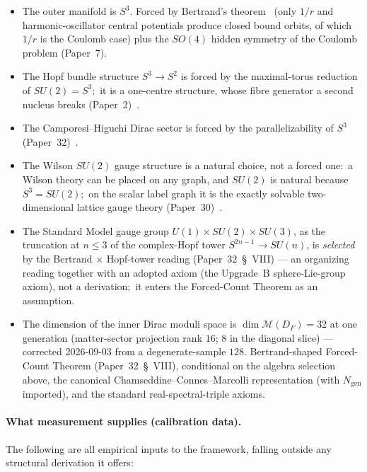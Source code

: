 \documentclass[11pt,a4paper]{article}
\newcommand{\sthree}{S^{3}}
\newcommand{\gvc}[2]{#2}
\begin{document}
\begin{itemize}
  \item The outer manifold is $\sthree$.  Forced by Bertrand's
    theorem~\cite{bertrand1873} (only $1/r$ and harmonic-oscillator
    central potentials produce closed bound orbits, of which $1/r$ is
    the Coulomb case) plus the $SO(4)$ hidden symmetry of the Coulomb
    problem (Paper~7).
  \item The Hopf bundle structure $\sthree \to S^2$ is forced by the
    maximal-torus reduction of $SU(2) = \sthree$;\ it is a one-centre
    structure, whose fibre generator a second nucleus breaks
    (Paper~2)~\cite{loutey_paper2}.
  \item The Camporesi--Higuchi Dirac sector is forced by the
    parallelizability of $\sthree$ (Paper~32)~\cite{loutey_paper32}.
  \item The Wilson $SU(2)$ gauge structure is a natural choice, not a
    forced one:\ a Wilson theory can be placed on any graph, and $SU(2)$
    is natural because $\sthree = SU(2)$;\ on the scalar label graph it is
    the exactly solvable two-dimensional lattice gauge theory
    (Paper~30)~\cite{loutey_paper30}.
  \item \gvc{sm-gauge-group-upgrade-b}{The Standard Model gauge group $U(1) \times SU(2) \times
    SU(3)$, as the truncation at $n \le 3$ of the complex-Hopf tower
    $S^{2n-1} \to SU(n)$, is \emph{selected} by the Bertrand $\times$
    Hopf-tower reading (Paper~32~\S~VIII) --- an organizing reading
    together with an adopted axiom (the Upgrade~B sphere-Lie-group
    axiom), not a derivation;\ it enters the Forced-Count Theorem as an
    assumption}.
  \item The dimension of the inner Dirac moduli space is
    $\dim \mathcal{M}(D_F) = 32$ at one generation (matter-sector
    projection rank $16$; $8$ in the diagonal slice) --- corrected
    2026-09-03 from a degenerate-sample $128$.  Bertrand-shaped
    Forced-Count Theorem (Paper~32~\S~VIII), conditional on the
    algebra selection above, the canonical Chamseddine--Connes--Marcolli
    representation (with $N_{\mathrm{gen}}$ imported), and the standard
    real-spectral-triple axioms.
\end{itemize}

\paragraph{What measurement supplies (calibration data).}

The following are all empirical inputs to the framework, falling
outside any structural derivation it offers:
\end{document}
